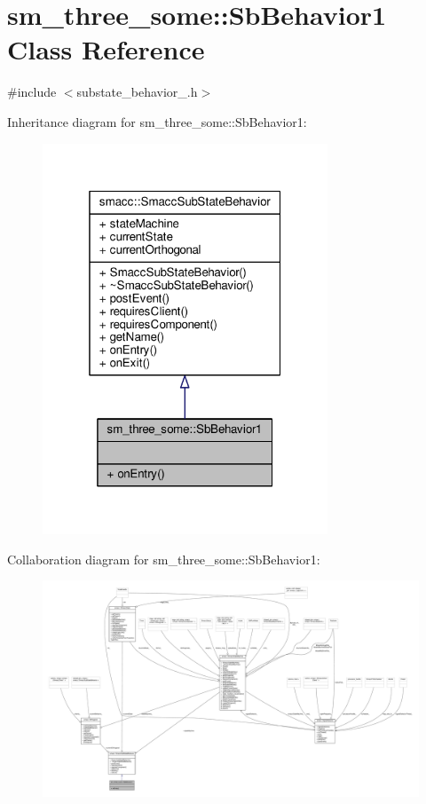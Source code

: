\hypertarget{classsm__three__some_1_1SbBehavior1}{}\section{sm\+\_\+three\+\_\+some\+:\+:Sb\+Behavior1 Class Reference}
\label{classsm__three__some_1_1SbBehavior1}


{\ttfamily \#include $<$substate\+\_\+behavior\+\_.\+h$>$}



Inheritance diagram for sm\+\_\+three\+\_\+some\+:\+:Sb\+Behavior1\+:
\nopagebreak
\begin{figure}[H]
\begin{center}
\leavevmode
\includegraphics[width=241pt]{classsm__three__some_1_1SbBehavior1__inherit__graph}
\end{center}
\end{figure}


Collaboration diagram for sm\+\_\+three\+\_\+some\+:\+:Sb\+Behavior1\+:
\nopagebreak
\begin{figure}[H]
\begin{center}
\leavevmode
\includegraphics[width=350pt]{classsm__three__some_1_1SbBehavior1__coll__graph}
\end{center}
\end{figure}
